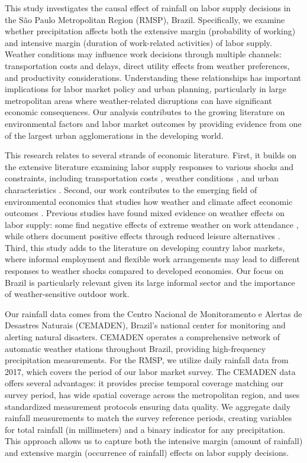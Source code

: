 This study investigates the causal effect of rainfall on labor supply decisions in the São Paulo Metropolitan Region (RMSP), Brazil. Specifically, we examine whether precipitation affects both the extensive margin (probability of working) and intensive margin (duration of work-related activities) of labor supply. Weather conditions may influence work decisions through multiple channels: transportation costs and delays, direct utility effects from weather preferences, and productivity considerations. Understanding these relationships has important implications for labor market policy and urban planning, particularly in large metropolitan areas where weather-related disruptions can have significant economic consequences. Our analysis contributes to the growing literature on environmental factors and labor market outcomes by providing evidence from one of the largest urban agglomerations in the developing world.

This research relates to several strands of economic literature. First, it builds on the extensive literature examining labor supply responses to various shocks and constraints, including transportation costs \citep{zenou2009urban}, weather conditions \citep{connolly2008here}, and urban characteristics \citep{moretti2011local}. Second, our work contributes to the emerging field of environmental economics that studies how weather and climate affect economic outcomes \citep{hsiang2016climate}. Previous studies have found mixed evidence on weather effects on labor supply: some find negative effects of extreme weather on work attendance \citep{lee2016temperature}, while others document positive effects through reduced leisure alternatives \citep{connolly2008here}. Third, this study adds to the literature on developing country labor markets, where informal employment and flexible work arrangements may lead to different responses to weather shocks compared to developed economies. Our focus on Brazil is particularly relevant given its large informal sector and the importance of weather-sensitive outdoor work.

Our rainfall data comes from the Centro Nacional de Monitoramento e Alertas de Desastres Naturais (CEMADEN), Brazil's national center for monitoring and alerting natural disasters. CEMADEN operates a comprehensive network of automatic weather stations throughout Brazil, providing high-frequency precipitation measurements. For the RMSP, we utilize daily rainfall data from 2017, which covers the period of our labor market survey. The CEMADEN data offers several advantages: it provides precise temporal coverage matching our survey period, has wide spatial coverage across the metropolitan region, and uses standardized measurement protocols ensuring data quality. We aggregate daily rainfall measurements to match the survey reference periods, creating variables for total rainfall (in millimeters) and a binary indicator for any precipitation. This approach allows us to capture both the intensive margin (amount of rainfall) and extensive margin (occurrence of rainfall) effects on labor supply decisions.

